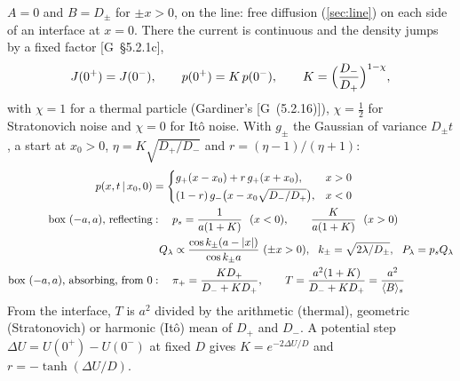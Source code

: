 \documentclass[11pt]{article}
\numberwithin{equation}{section}
\newcommand{\avg}[1]{\langle #1\rangle}
\newcommand{\given}{\,|\,}
\newcommand{\G}[1]{[G~(#1)]}
\newcommand{\Gs}[1]{[G~\S#1]}
\begin{document}
\begin{keyresults}
$A=0$ and $B=D_\pm$ for $\pm x>0$, on the line: free diffusion (\cref{sec:line}) on each side of an interface at
$x=0$. There the current is continuous and the density jumps by a fixed factor \Gs{5.2.1c},
\begin{equation}
  J(0^+)=J(0^-),\qquad p(0^+)=K\,p(0^-),\qquad K=\Bigl(\frac{D_-}{D_+}\Bigr)^{1-\chi},
  \label{eq:interface}
\end{equation}
with $\chi=1$ for a thermal particle (Gardiner's \G{5.2.16}), $\chi=\frac12$ for Stratonovich noise and $\chi=0$ for
It\^o noise. With $g_\pm$ the Gaussian of variance $D_\pm t$, a start at $x_0>0$, $\eta=K\sqrt{D_+/D_-}$ and
$r=(\eta-1)/(\eta+1)$:
\begin{align}
  p(x,t\given x_0,0) &= \begin{cases} g_+(x-x_0)+r\,g_+(x+x_0), & x>0\\[2pt]
  (1-r)\,g_-\bigl(x-x_0\sqrt{D_-/D_+}\bigr), & x<0\end{cases}
  \label{eq:interface-p}\\
  \text{box }(-a,a)\text{, reflecting} &:\quad p_s=\frac{1}{a(1+K)}\ \ (x<0),\qquad \frac{K}{a(1+K)}\ \ (x>0) \\
  &\phantom{:}\ Q_\lambda\propto\frac{\cos k_\pm(a-|x|)}{\cos k_\pm a}\ (\pm x>0),\ \ k_\pm=\sqrt{2\lambda/D_\pm},\ \
  P_\lambda=p_sQ_\lambda \notag\\
  \text{box }(-a,a)\text{, absorbing, from }0 &:\quad \pi_+=\frac{KD_+}{D_-+KD_+},\qquad
  T=\frac{a^2(1+K)}{D_-+KD_+}=\frac{a^2}{\avg{B}_s}
\end{align}
From the interface, $T$ is $a^2$ divided by the arithmetic (thermal), geometric (Stratonovich) or harmonic (It\^o)
mean of $D_+$ and $D_-$. A potential step $\Delta U=U(0^+)-U(0^-)$ at fixed $D$ gives $K=e^{-2\Delta U/D}$ and
$r=-\tanh(\Delta U/D)$.
\end{keyresults}
\end{document}
